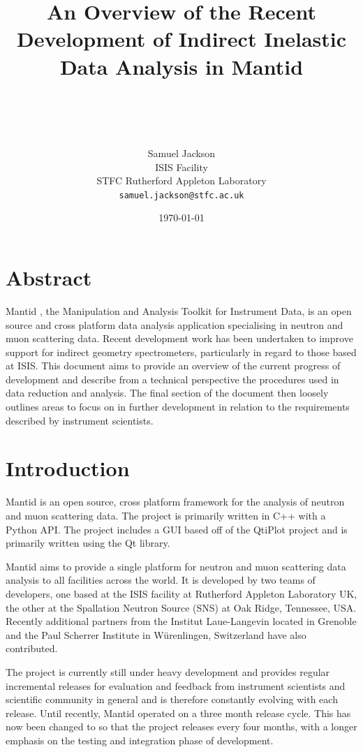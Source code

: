 \documentclass[paper=a4, fontsize=11pt]{scrartcl}	%
\title{ \vspace{-1in} 	\usefont{OT1}{bch}{b}{n}
		\huge \strut An Overview of the Recent Development of Indirect Inelastic Data Analysis in Mantid\strut \\
}
\author{ 									\usefont{OT1}{bch}{m}{n}
        Samuel Jackson\\		\usefont{OT1}{bch}{m}{n}
		ISIS Facility\\	\usefont{OT1}{bch}{m}{n}
        STFC Rutherford Appleton Laboratory\\
        \texttt{samuel.jackson@stfc.ac.uk}
}
\date{\today}
\numberwithin{equation}{section}															%
\numberwithin{figure}{section}																%
\numberwithin{table}{section}																%
\begin{document}
\maketitle
\clearpage
\tableofcontents

\clearpage
\section{Abstract}
Mantid \cite{mantid}, the Manipulation and Analysis Toolkit for Instrument Data, is an open source and cross platform data analysis application specialising in neutron and muon scattering data. Recent development work has been undertaken to improve support for indirect geometry spectrometers, particularly in regard to those based at ISIS. This document aims to provide an overview of the current progress of development and describe from a technical perspective the procedures used in data reduction and analysis. The final section of the document then loosely outlines areas to focus on in further development in relation to the requirements described by instrument scientists.

\clearpage
\section{Introduction}
Mantid \cite{mantid} is an open source, cross platform framework for the analysis of neutron and muon scattering data. The project is primarily written in C++ with a Python API. The project includes a GUI based off of the QtiPlot project and is primarily written using the Qt library.

Mantid aims to provide a single platform for neutron and muon scattering data analysis to all facilities across the world. It is developed by two teams of developers, one based at the ISIS facility at Rutherford Appleton Laboratory UK, the other at the Spallation Neutron Source (SNS) at Oak Ridge, Tennessee, USA. Recently additional partners from the Institut Laue-Langevin located in Grenoble and the Paul Scherrer Institute in Würenlingen, Switzerland have also contributed.

The project is currently still under heavy development and provides regular incremental releases for evaluation and feedback from instrument scientists and scientific community in general and is therefore constantly evolving with each release. Until recently, Mantid operated on a three month release cycle. This has now been changed to so that the project releases every four months, with a longer emphasis on the testing and integration phase of development.
\end{document}
